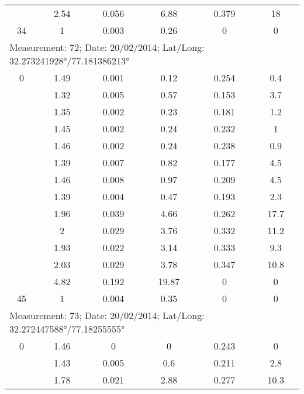 \begin{longtable}{cccccc}
		& 2.54  & 0.056 & 6.88  & 0.379 & 18 \\
		
		34    & 1     & 0.003 & 0.26  & 0     & 0 \\
		\midrule
		\multicolumn{6}{l}{Measurement: 72; Date: 20/02/2014;
			Lat/Long: 32.273241928°/77.181386213°} \\		
		\midrule
		0     & 1.49  & 0.001 & 0.12  & 0.254 & 0.4 \\
		
		& 1.32  & 0.005 & 0.57  & 0.153 & 3.7 \\
		
		& 1.35  & 0.002 & 0.23  & 0.181 & 1.2 \\
		
		& 1.45  & 0.002 & 0.24  & 0.232 & 1 \\
		
		& 1.46  & 0.002 & 0.24  & 0.238 & 0.9 \\
		
		& 1.39  & 0.007 & 0.82  & 0.177 & 4.5 \\
		
		& 1.46  & 0.008 & 0.97  & 0.209 & 4.5 \\
		
		& 1.39  & 0.004 & 0.47  & 0.193 & 2.3 \\
		
		& 1.96  & 0.039 & 4.66  & 0.262 & 17.7 \\
		
		& 2     & 0.029 & 3.76  & 0.332 & 11.2 \\
		
		& 1.93  & 0.022 & 3.14  & 0.333 & 9.3 \\
		
		& 2.03  & 0.029 & 3.78  & 0.347 & 10.8 \\
		
		& 4.82  & 0.192 & 19.87 & 0     & 0 \\
		
		45    & 1     & 0.004 & 0.35  & 0     & 0 \\
		\midrule
		\multicolumn{6}{l}{Measurement: 73; Date: 20/02/2014;
			Lat/Long: 32.272447588°/77.18255555°} \\		
		\midrule
		0     & 1.46  & 0     & 0     & 0.243 & 0 \\
		
		& 1.43  & 0.005 & 0.6   & 0.211 & 2.8 \\
		
		& 1.78  & 0.021 & 2.88  & 0.277 & 10.3 \\
		

\end{longtable}

